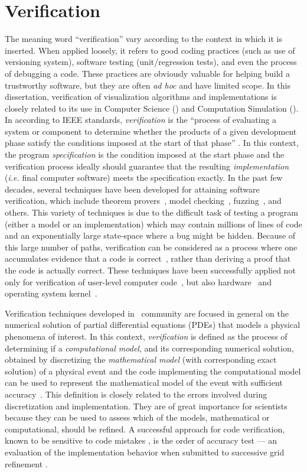 \section{Verification}

The meaning word ``verification'' vary according to the context in which it is inserted. When applied loosely, it refers to good coding practices
(such as use of versioning system), software testing (unit/regression tests), and even the process of debugging a code. These practices are obviously valuable for helping build a trustworthy software, but they are often \emph{ad hoc} and have limited scope. 
In this dissertation, verification of visualization algorithms and implementations is closely related to its use in Computer Science (\cs) and Computation Simulation (\cse). 
In \cs{} according to IEEE standards, 
\emph{verification} is the ``process of evaluating a 
system or component to determine whether the products of a given 
development phase satisfy the conditions imposed at the start of
that phase'' \cite{159342}.
%
In this context, the program \emph{specification} is the condition
imposed at the start phase and the verification process
ideally should guarantee that the resulting \emph{implementation}
({\em i.e.} final computer software) meets the 
specification exactly. 
%
In the past
few decades, several techniques have been developed
for attaining software verification, which include theorem
provers~\cite{Bowen95}, 
model checking~\cite{Clarke08},
fuzzing~\cite{bird83, godefroid08},  and others. This variety of
techniques is due to the difficult task of testing a program (either
a model or an implementation) which may contain millions of lines
of code and an exponentially large state-space where a
bug might be 
hidden. Because of this large number of paths,
verification can be considered as a
process where one accumulates evidence that a code is
correct~\cite{roach98}, rather than deriving a proof that the code is actually correct.
These techniques have been successfully applied not only for
verification of 
user-level computer code~\cite{1646374}, but also
hardware~\cite{seger92} and  
operating system kernel~\cite{1629596}. 

Verification techniques developed in \cse~community are focused in general on the
numerical solution of partial differential equations (PDEs) that 
models a physical phenomena of
interest. In this context, 
\emph{verification} is defined as the process of determining if a
\emph{computational model}, and its corresponding numerical solution, 
obtained by discretizing the \emph{mathematical model} (with corresponding
exact solution) of a physical event and the code
implementing the computational model  
can be used to represent the mathematical model of the event with 
sufficient accuracy~\cite{babuska04}.
%
This definition is closely related to the errors involved during
discretization and implementation. They are of great importance for
scientists because they can be used to assess which of the models,
mathematical or computational, should be refined.  A successful
approach for code verification, known to be sensitive to code
mistakes \cite{roach98}, is the order of accuracy test --- an
evaluation of the implementation behavior when submitted to successive
grid refinement \cite{roach98}. 

